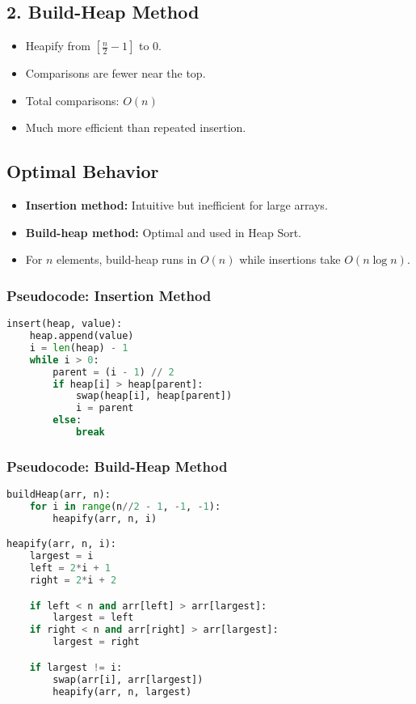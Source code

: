 \documentclass[14pt]{extarticle}
\begin{document}
\subsection*{2. Build-Heap Method}
\begin{itemize}
    \item Heapify from \( \left[ \frac{n}{2} - 1 \right] \) to 0.
    \item Comparisons are fewer near the top.
    \item Total comparisons: \( O(n) \)
    \item Much more efficient than repeated insertion.
\end{itemize}

\vspace{0.5em}

\subsection*{Optimal Behavior}
\begin{itemize}
    \item \textbf{Insertion method:} Intuitive but inefficient for large arrays.
    \item \textbf{Build-heap method:} Optimal and used in Heap Sort.
    \item For \( n \) elements, build-heap runs in \( O(n) \) while insertions take \( O(n \log n) \).
\end{itemize}



\newpage
\subsubsection*{Pseudocode: Insertion Method}
\begin{lstlisting}[language=Python]
insert(heap, value):
    heap.append(value)
    i = len(heap) - 1
    while i > 0:
        parent = (i - 1) // 2
        if heap[i] > heap[parent]:
            swap(heap[i], heap[parent])
            i = parent
        else:
            break
\end{lstlisting}

\vspace{4em}

\subsubsection*{Pseudocode: Build-Heap Method}

\begin{lstlisting}[language=Python]
buildHeap(arr, n):
    for i in range(n//2 - 1, -1, -1):
        heapify(arr, n, i)

heapify(arr, n, i):
    largest = i
    left = 2*i + 1
    right = 2*i + 2

    if left < n and arr[left] > arr[largest]:
        largest = left
    if right < n and arr[right] > arr[largest]:
        largest = right

    if largest != i:
        swap(arr[i], arr[largest])
        heapify(arr, n, largest)
\end{lstlisting}
\end{document}

